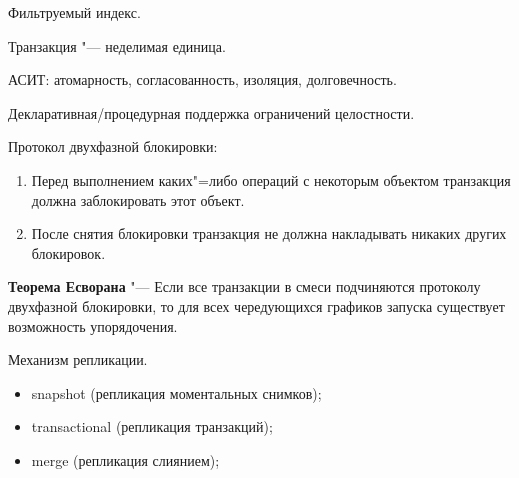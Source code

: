 \documentclass[12pt]{article}
\begin{document}
Фильтруемый индекс.

Транзакция "--- неделимая единица.

АСИТ: атомарность, согласованность, изоляция, долговечность.

Декларативная/процедурная поддержка ограничений целостности.

Протокол двухфазной блокировки:
\begin{enumerate}
	\item Перед выполнением каких"=либо операций с некоторым объектом транзакция должна заблокировать этот объект.
	\item После снятия блокировки транзакция не должна накладывать никаких других блокировок.
\end{enumerate}

\textbf{Теорема Есворана} "--- Если все транзакции в смеси подчиняются протоколу двухфазной блокировки, то для всех чередующихся графиков запуска существует возможность упорядочения.

Механизм репликации.

\begin{itemize}
	\item snapshot (репликация моментальных снимков);
	\item transactional (репликация транзакций);
	\item merge (репликация слиянием);
\end{itemize}
\end{document}
